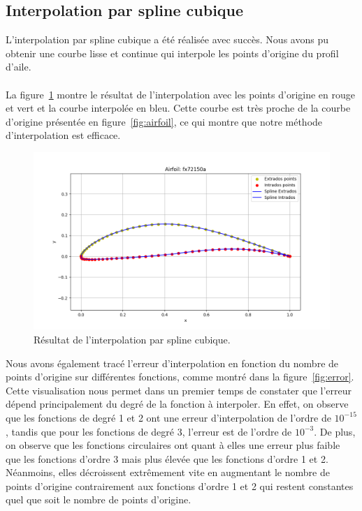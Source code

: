\documentclass{article}
\begin{document}
\subsection{Interpolation par spline cubique}
\begin{minipage}{0.45\textwidth}
  L'interpolation par spline cubique a été réalisée avec succès. Nous avons pu obtenir une courbe lisse et continue qui interpole les points d'origine du profil d'aile. \\ \\
  La figure~\ref{fig:spline} montre le résultat de l'interpolation avec les points d'origine en rouge et vert et la courbe interpolée en bleu. Cette courbe est très proche de la courbe d'origine présentée en figure~\ref{fig:airfoil}, ce qui montre que notre méthode d'interpolation est efficace. 
\end{minipage}
\hfill
\hfill
\begin{minipage}{0.5\textwidth}
  \begin{figure}[H]
    \centering
    \includegraphics[trim=45 20 70 50, clip, width=\textwidth]{spline.png}
    \caption{Résultat de l'interpolation par spline cubique.}
    \label{fig:spline}
  \end{figure}
  \hspace{0.25cm}
\end{minipage}
Nous avons également tracé l'erreur d'interpolation en fonction du nombre de points d'origine sur différentes fonctions, comme montré dans la figure~\ref{fig:error}. Cette visualisation nous permet dans un premier temps de constater que l'erreur dépend principalement du degré de la fonction à interpoler. En effet, on observe que les fonctions de degré 1 et 2 ont une erreur d'interpolation de l'ordre de $10^{-15}$, tandis que pour les fonctions de degré 3, l'erreur est de l'ordre de $10^{-3}$. De plus, on observe que les fonctions circulaires ont quant à elles une erreur plus faible que les fonctions d'ordre 3 mais plus élevée que les fonctions d'ordre 1 et 2. Néanmoins, elles décroissent extrêmement vite en augmentant le nombre de points d'origine contrairement aux fonctions d'ordre 1 et 2 qui restent constantes quel que soit le nombre de points d'origine.\\ \\
\end{document}
